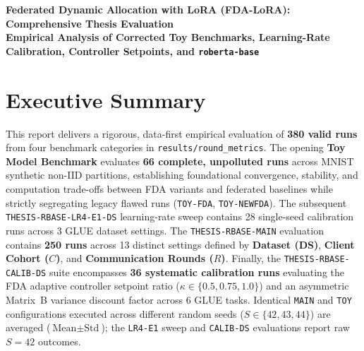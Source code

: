 \documentclass[10pt,a4paper]{article}
\begin{document}
\begin{center}
\LARGE \textbf{Federated Dynamic Allocation with LoRA (FDA-LoRA): Comprehensive Thesis Evaluation}\\[0.4em]
\large \textbf{Empirical Analysis of Corrected Toy Benchmarks, Learning-Rate Calibration, Controller Setpoints, and \texttt{roberta-base}}
\end{center}
\vspace{0.8em}

\section*{Executive Summary}
This report delivers a rigorous, data-first empirical evaluation of \textbf{380 valid runs} from four benchmark categories in \texttt{results/round\_metrics}.
The opening \textbf{Toy Model Benchmark} evaluates \textbf{66 complete, unpolluted runs} across MNIST synthetic non-IID partitions, establishing foundational convergence, stability, and computation trade-offs between FDA variants and federated baselines while strictly segregating legacy flawed runs (\texttt{TOY-FDA}, \texttt{TOY-NEWFDA}).
The subsequent \texttt{THESIS-RBASE-LR4-E1-DS} learning-rate sweep contains 28 single-seed calibration runs across 3 GLUE dataset settings.
The \texttt{THESIS-RBASE-MAIN} evaluation contains \textbf{250 runs} across 13 distinct settings defined by \textbf{Dataset (DS)}, \textbf{Client Cohort ($C$)}, and \textbf{Communication Rounds ($R$)}.
Finally, the \texttt{THESIS-RBASE-CALIB-DS} suite encompasses \textbf{36 systematic calibration runs} evaluating the FDA adaptive controller setpoint ratio ($\kappa \in \{0.5, 0.75, 1.0\}$) and an asymmetric Matrix~B variance discount factor across 6 GLUE tasks.
Identical \texttt{MAIN} and \texttt{TOY} configurations executed across different random seeds ($S \in \{42, 43, 44\}$) are averaged ($\text{Mean} \pm \text{Std}$); the \texttt{LR4-E1} sweep and \texttt{CALIB-DS} evaluations report raw $S=42$ outcomes.
\end{document}
